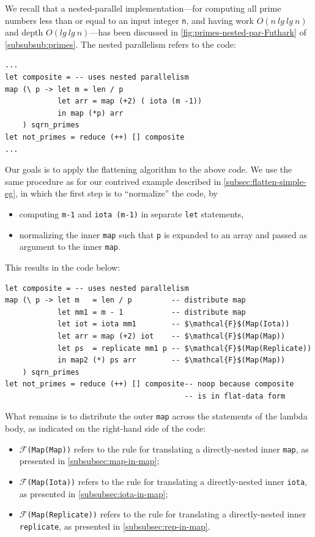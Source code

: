 \documentclass[acmsmall,review]{acmart}\settopmatter{printfolios=true,printccs=false,printacmref=false}
\begin{document}
We recall that a nested-parallel implementation---for computing all prime numbers 
less than or equal to an input integer {\tt n}, and having work $O(n~lg~lg~n)$ 
and depth $O(lg~lg~n)$---has been discussed in \cref{fig:primes-nested-par-Futhark}
of \cref{subsubsub:primes}. The nested parallelism refers to the code:
\begin{lstlisting}[mathescape=true]
...
let composite = -- uses nested parallelism
map (\ p -> let m = len / p
            let arr = map (+2) ( iota (m -1))
            in map (*p) arr
    ) sqrn_primes
let not_primes = reduce (++) [] composite
...
\end{lstlisting}\vspace{-2ex}
Our goals is to apply the flattening algorithm to the above code.
We use the same procedure as for our contrived example described 
in \cref{subsec:flatten-simple-eg}, in which the first step is to
``normalize'' the code, by 
\begin{itemize}
    \item computing {\tt m-1} and \lstinline{iota (m-1)} in
            separate \lstinline{let} statements,
    \item normalizing the inner \lstinline{map} such that
            {\tt p} is expanded to an array and passed as
            argument to the inner \lstinline{map}.
\end{itemize}
This results in the code below:
\begin{lstlisting}[mathescape=true]
let composite = -- uses nested parallelism
map (\ p -> let m   = len / p         -- distribute map
            let mm1 = m - 1           -- distribute map
            let iot = iota mm1        -- $\mathcal{F}$(Map(Iota))
            let arr = map (+2) iot    -- $\mathcal{F}$(Map(Map))
            let ps  = replicate mm1 p -- $\mathcal{F}$(Map(Replicate))
            in map2 (*) ps arr        -- $\mathcal{F}$(Map(Map))
    ) sqrn_primes
let not_primes = reduce (++) [] composite-- noop because composite
                                         -- is in flat-data form
\end{lstlisting}\vspace{-2ex}
What remains is to distribute the outer \lstinline{map} across
the statements of the lambda body, as indicated on the right-hand
side of the code:
\begin{itemize}
    \item {\tt $\mathcal{F}$(Map(Map))} refers to the rule for
        translating a directly-nested inner \lstinline{map},
        as presented in \cref{subsubsec:map-in-map};
    \item {\tt $\mathcal{F}$(Map(Iota))} refers to the rule for
        translating a directly-nested inner \lstinline{iota}, 
        as presented in \cref{subsubsec:iota-in-map};
    \item {\tt $\mathcal{F}$(Map(Replicate))} refers to the rule for
        translating a directly-nested inner \lstinline{replicate}, 
        as presented in \cref{subsubsec:rep-in-map}.
\end{itemize}
\end{document}
